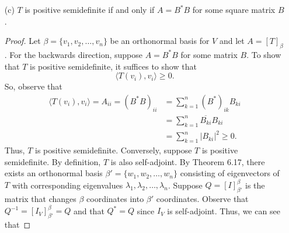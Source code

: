 \begin{enumerate}
\begin{proof}
        \begin{align*}
            \langle T(x) , x  \rangle &= \Big\langle T \Big(  \sum_{ j=1  }^{ n } \langle x , {v}_{j}  \rangle {v}_{j} \Big)  , \sum_{ i=1  }^{ n } \langle x , {v}_{i} \rangle {v}_{i}  \Big\rangle \\
&= \Big\langle \sum_{ j=1  }^{ n } \langle x , {v}_{j} \rangle T({v}_{j}), \sum_{ i=1  }^{ n } \langle x , {v}_{i} \rangle {v}_{i} \Big\rangle \\
&= \sum_{ j=1  }^{ n } \langle x , {v}_{j} \rangle \sum_{ i=1 }^{ n  } \overline{\langle x , {v}_{i} \rangle} \langle T({v}_{j}) , {v}_{i} \rangle \\
&= \sum_{ i,j }^{  } \langle T({v}_{j}) , {v}_{i} \rangle \langle x , {v}_{j} \rangle \overline{\langle x , {v}_{i} \rangle} \\
&= \sum_{ i,j }^{  } {A}_{ij} \langle x , {v}_{j} \rangle \overline{\langle x , {v}_{i} \rangle} > 0.
\end{align*}
Note that \( T  \) is self-adjoint by assumption. Thus, we conclude that \( T  \) is positive definite.
\end{proof}
    \item[(c)] \( T  \) is positive semidefinite if and only if \( A = B^{*} B  \) for some square matrix \( B  \).
        \begin{proof}
        Let \( \beta = \{ {v}_{1}, {v}_{2}, \dots, {v}_{n} \}   \) be an orthonormal basis for \( V  \) and let \( A = [T]_{\beta} \). For the backwards direction, suppose \( A = B^{*} B  \) for some matrix \( B  \). To show that \( T  \) is positive semidefinite, it suffices to show that 
        \[ \langle T({v}_{i}) , {v}_{i} \rangle \geq  0.  \] 
        So, observe that
        \begin{align*}
            \langle T({v}_{i}) , {v}_{i}  \rangle = {A}_{ii} = {(B^{*}B)}_{ii} 
                                                             &= \sum_{ k=1  }^{ n } {(B^{*})}_{ik} {B}_{ki} \\
                                                             &= \sum_{ k=1  }^{ n } \overline{{B}_{ki}}{B}_{ki} \\
                                                             &= \sum_{ k=1  }^{ n } | {B}_{ki} |^{2} \geq 0. 
        \end{align*}
        Thus, \( T  \) is positive semidefinite. Conversely, suppose \( T  \) is positive semidefinite. By definition, \( T  \) is also self-adjoint. By Theorem 6.17, there exists an orthonormal basis \( \beta' = \{ {w}_{1}, {w}_{2}, \dots, {w}_{n} \}  \) consisting of eigenvectors of \( T  \) with corresponding eigenvalues \( {\lambda}_{1}, {\lambda}_{2}, \dots, {\lambda}_{n} \). Suppose \( Q = [I]_{\beta'}^{\beta}  \) is the matrix that changes \( \beta  \) coordinates into \( \beta'  \) coordinates. Observe that \( Q^{-1} = [{I}_{V}]_{\beta'}^{\beta} = Q  \) and that \( Q^{*} = Q  \) since \( {I}_{V} \) is self-adjoint. Thus, we can see that   

\end{proof}
\end{enumerate}
